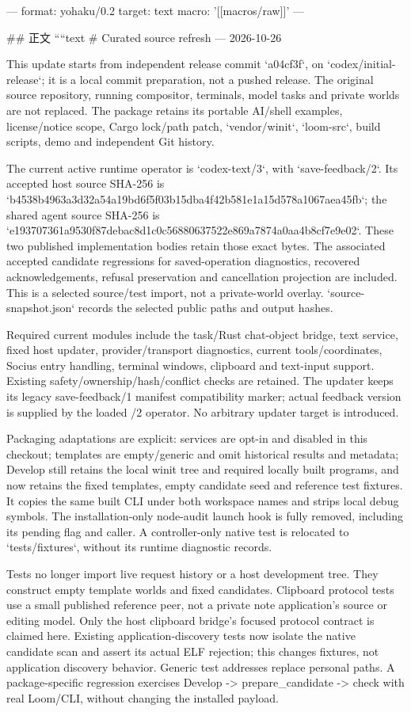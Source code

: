 ---
format: yohaku/0.2
target: text
macro: '[[macros/raw]]'
---

## 正文
````text
# Curated source refresh — 2026-10-26

This update starts from independent release commit `a04cf3f`, on
`codex/initial-release`; it is a local commit preparation, not a pushed release.
The original source repository, running compositor, terminals, model tasks and
private worlds are not replaced. The package retains its portable AI/shell
examples, license/notice scope, Cargo lock/path patch, `vendor/winit`, `loom-src`,
build scripts, demo and independent Git history.

The current active runtime operator is `codex-text/3`, with `save-feedback/2`.
Its accepted host source SHA-256 is
`b4538b4963a3d32a54a19bd6f5f03b15dba4f42b581e1a15d578a1067aea45fb`;
the shared agent source SHA-256 is
`e193707361a9530f87debac8d1c0c56880637522e869a7874a0aa4b8cf7e9e02`.
These two published implementation bodies retain those exact bytes. The
associated accepted candidate regressions for saved-operation diagnostics,
recovered acknowledgements, refusal preservation and cancellation projection
are included. This is a selected source/test import, not a private-world overlay.
`source-snapshot.json` records the selected public paths and output hashes.

Required current modules include the task/Rust chat-object bridge, text service,
fixed host updater, provider/transport diagnostics, current tools/coordinates,
Socius entry handling, terminal windows, clipboard and text-input support.
Existing safety/ownership/hash/conflict checks are retained. The updater keeps
its legacy save-feedback/1 manifest compatibility marker; actual feedback
version is supplied by the loaded /2 operator. No arbitrary updater target is
introduced.

Packaging adaptations are explicit: services are opt-in and disabled in this
checkout; templates are empty/generic and omit historical results and metadata;
Develop still retains the local winit tree and required locally built programs,
and now retains the fixed templates, empty candidate seed and reference test
fixtures. It copies the same built CLI under both workspace names and strips
local debug symbols. The installation-only node-audit launch hook is fully
removed, including its pending flag and caller. A controller-only native test
is relocated to `tests/fixtures`, without its runtime diagnostic records.

Tests no longer import live request history or a host development tree. They
construct empty template worlds and fixed candidates. Clipboard protocol tests
use a small published reference peer, not a private note application's source
or editing model. Only the host clipboard bridge's focused protocol contract is
claimed here. Existing application-discovery tests now isolate the native
candidate scan and assert its actual ELF rejection; this changes fixtures, not
application discovery behavior. Generic test addresses replace personal paths.
A package-specific regression exercises Develop -> prepare_candidate -> check
with real Loom/CLI, without changing the installed payload.

